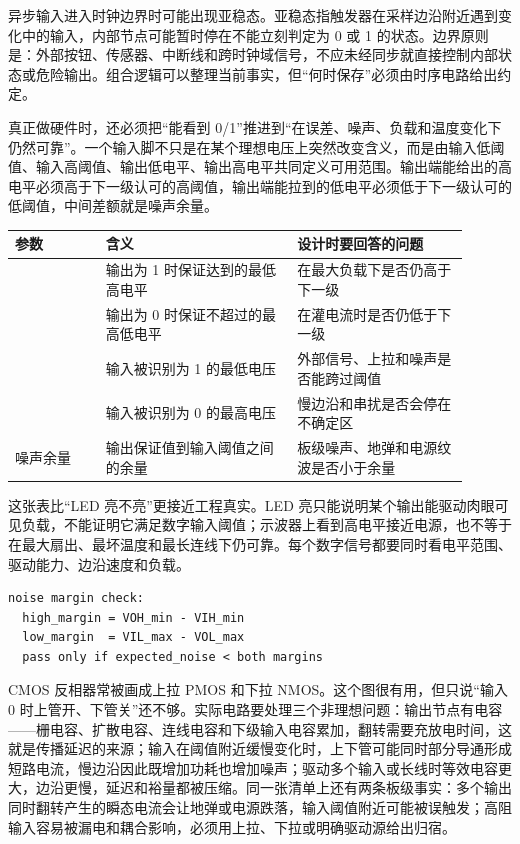 异步输入进入时钟边界时可能出现亚稳态。亚稳态指触发器在采样边沿附近遇到变化中的输入，内部节点可能暂时停在不能立刻判定为 0 或 1 的状态。边界原则是：外部按钮、传感器、中断线和跨时钟域信号，不应未经同步就直接控制内部状态或危险输出。组合逻辑可以整理当前事实，但“何时保存”必须由时序电路给出约定。

真正做硬件时，还必须把“能看到 0/1”推进到“在误差、噪声、负载和温度变化下仍然可靠”。一个输入脚不只是在某个理想电压上突然改变含义，而是由输入低阈值、输入高阈值、输出低电平、输出高电平共同定义可用范围。输出端能给出的高电平必须高于下一级认可的高阈值，输出端能拉到的低电平必须低于下一级认可的低阈值，中间差额就是噪声余量。

\begin{longtable}{L{0.18\linewidth}L{0.38\linewidth}L{0.34\linewidth}}
\toprule
参数 & 含义 & 设计时要回答的问题 \\
\midrule
{} & 输出为 1 时保证达到的最低高电平 & 在最大负载下是否仍高于下一级  \\\tablerowrule
{} & 输出为 0 时保证不超过的最高低电平 & 在灌电流时是否仍低于下一级  \\\tablerowrule
{} & 输入被识别为 1 的最低电压 & 外部信号、上拉和噪声是否能跨过阈值 \\\tablerowrule
{} & 输入被识别为 0 的最高电压 & 慢边沿和串扰是否会停在不确定区 \\\tablerowrule
噪声余量 & 输出保证值到输入阈值之间的余量 & 板级噪声、地弹和电源纹波是否小于余量 \\
\bottomrule
\end{longtable}

这张表比“LED 亮不亮”更接近工程真实。LED 亮只能说明某个输出能驱动肉眼可见负载，不能证明它满足数字输入阈值；示波器上看到高电平接近电源，也不等于在最大扇出、最坏温度和最长连线下仍可靠。每个数字信号都要同时看电平范围、驱动能力、边沿速度和负载。

\begin{lstlisting}
noise margin check:
  high_margin = VOH_min - VIH_min
  low_margin  = VIL_max - VOL_max
  pass only if expected_noise < both margins
\end{lstlisting}

CMOS 反相器常被画成上拉 PMOS 和下拉 NMOS。这个图很有用，但只说“输入 0 时上管开、下管关”还不够。实际电路要处理三个非理想问题：输出节点有电容——栅电容、扩散电容、连线电容和下级输入电容累加，翻转需要充放电时间，这就是传播延迟的来源；输入在阈值附近缓慢变化时，上下管可能同时部分导通形成短路电流，慢边沿因此既增加功耗也增加噪声；驱动多个输入或长线时等效电容更大，边沿更慢，延迟和裕量都被压缩。同一张清单上还有两条板级事实：多个输出同时翻转产生的瞬态电流会让地弹或电源跌落，输入阈值附近可能被误触发；高阻输入容易被漏电和耦合影响，必须用上拉、下拉或明确驱动源给出归宿。

